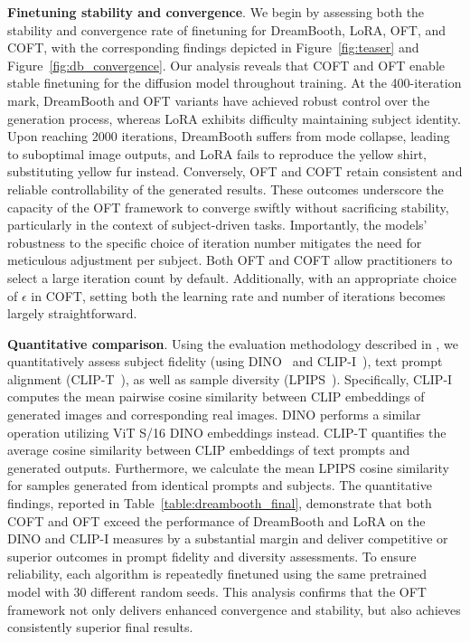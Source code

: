 {\textbf{Finetuning stability and convergence}. We begin by assessing both the stability and convergence rate of finetuning for DreamBooth, LoRA, OFT, and COFT, with the corresponding findings depicted in Figure~\ref{fig:teaser} and Figure~\ref{fig:db_convergence}. Our analysis reveals that COFT and OFT enable stable finetuning for the diffusion model throughout training. At the 400-iteration mark, DreamBooth and OFT variants have achieved robust control over the generation process, whereas LoRA exhibits difficulty maintaining subject identity. Upon reaching 2000 iterations, DreamBooth suffers from mode collapse, leading to suboptimal image outputs, and LoRA fails to reproduce the yellow shirt, substituting yellow fur instead. Conversely, OFT and COFT retain consistent and reliable controllability of the generated results. These outcomes underscore the capacity of the OFT framework to converge swiftly without sacrificing stability, particularly in the context of subject-driven tasks. Importantly, the models’ robustness to the specific choice of iteration number mitigates the need for meticulous adjustment per subject. Both OFT and COFT allow practitioners to select a large iteration count by default. Additionally, with an appropriate choice of $\epsilon$ in COFT, setting both the learning rate and number of iterations becomes largely straightforward.

\textbf{Quantitative comparison}. Using the evaluation methodology described in \cite{ruiz2023dreambooth}, we quantitatively assess subject fidelity (using DINO~\cite{caron2021emerging} and CLIP-I~\cite{radford2021learning}), text prompt alignment (CLIP-T~\cite{radford2021learning}), as well as sample diversity (LPIPS~\cite{zhang2018unreasonable}). Specifically, CLIP-I computes the mean pairwise cosine similarity between CLIP embeddings of generated images and corresponding real images. DINO performs a similar operation utilizing ViT S/16 DINO embeddings instead. CLIP-T quantifies the average cosine similarity between CLIP embeddings of text prompts and generated outputs. Furthermore, we calculate the mean LPIPS cosine similarity for samples generated from identical prompts and subjects. The quantitative findings, reported in Table~\ref{table:dreambooth_final}, demonstrate that both COFT and OFT exceed the performance of DreamBooth and LoRA on the DINO and CLIP-I measures by a substantial margin and deliver competitive or superior outcomes in prompt fidelity and diversity assessments. To ensure reliability, each algorithm is repeatedly finetuned using the same pretrained model with 30 different random seeds. This analysis confirms that the OFT framework not only delivers enhanced convergence and stability, but also achieves consistently superior final results.

}
